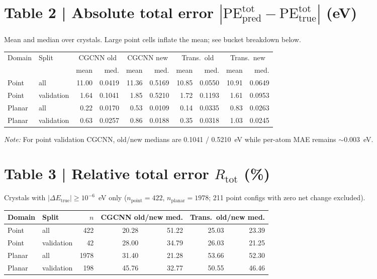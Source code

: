 \documentclass[11pt,a4paper]{article}
\begin{document}
\section*{Table 2 | Absolute total error $|\mathrm{PE}_{\mathrm{pred}}^{\mathrm{tot}}-\mathrm{PE}_{\mathrm{true}}^{\mathrm{tot}}|$ (eV)}

Mean and median over crystals. Large point cells inflate the mean; see bucket breakdown below.

\begin{center}
\small
\begin{tabular}{llrrrrrrrr}
  \toprule
  Domain & Split & \multicolumn{2}{c}{CGCNN old} & \multicolumn{2}{c}{CGCNN new} & \multicolumn{2}{c}{Trans.\ old} & \multicolumn{2}{c}{Trans.\ new} \\
  & & mean & med. & mean & med. & mean & med. & mean & med. \\
  \midrule
  Point  & all        & 11.00 & 0.0419 & 11.36 & 0.5169 & 10.85 & 0.0550 & 10.91 & 0.0649 \\
  Point  & validation & 1.64 & 0.1041 & 1.85 & 0.5210 & 1.72 & 0.1193 & 1.61 & 0.0953 \\
  Planar & all        & 0.22 & 0.0170 & 0.53 & 0.0109 & 0.14 & 0.0335 & 0.83 & 0.0263 \\
  Planar & validation & 0.63 & 0.0257 & 0.86 & 0.0188 & 0.35 & 0.0318 & 1.03 & 0.0245 \\
  \bottomrule
\end{tabular}
\end{center}

\noindent\textit{Note:} For point validation CGCNN, old/new medians are 0.1041 / 0.5210~eV while per-atom MAE remains $\sim 0.003$~eV.

\section*{Table 3 | Relative total error $R_{\mathrm{tot}}$ (\%)}

Crystals with $|\Delta E_{\mathrm{true}}|\ge 10^{-6}$~eV only ($n_{\mathrm{point}}=422$, $n_{\mathrm{planar}}=1978$; 211 point configs with zero net change excluded).

\begin{center}
\footnotesize
\setlength{\tabcolsep}{4pt}
\begin{tabular}{ll r rr rr}
  \toprule
  Domain & Split & $n$ & \multicolumn{2}{c}{CGCNN old/new med.} & \multicolumn{2}{c}{Trans.\ old/new med.} \\
  \midrule
  Point  & all        & 422 & 20.28 & 51.22 & 25.03 & 23.39 \\
  Point  & validation & 42 & 28.00 & 34.79 & 26.03 & 21.25 \\
  Planar & all        & 1978 & 31.40 & 21.28 & 53.66 & 52.30 \\
  Planar & validation & 198 & 45.76 & 32.77 & 50.55 & 46.46 \\
  \bottomrule
\end{tabular}
\end{center}
\end{document}
